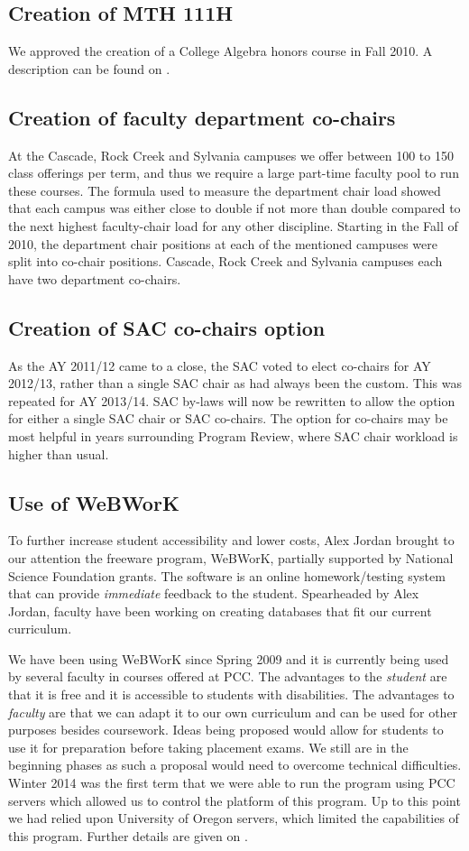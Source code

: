 \subsection{Creation of MTH 111H}
We approved the creation of a College Algebra honors course in Fall 2010.
A description can be found on .
\subsection{Creation of faculty department co-chairs}
At the Cascade, Rock Creek and Sylvania campuses we offer between 100 to 150 class offerings per term, and thus we require a large part-time faculty pool to run these courses.
The formula used to measure the department chair load showed that each campus was either close to double if not more than double compared to the next highest faculty-chair load for any other discipline.
Starting in the Fall of 2010, the department chair positions at each of the mentioned campuses were split into co-chair positions.
Cascade, Rock Creek and Sylvania campuses each have two department co-chairs.
\subsection{Creation of SAC co-chairs option}
As the AY 2011/12 came to a close, the SAC voted to elect co-chairs for AY 2012/13, rather than a single SAC chair as had always been the custom.
This was repeated for AY 2013/14.
SAC by-laws will now be rewritten to allow the option for either a single SAC chair or SAC co-chairs.
The option for co-chairs may be most helpful in years surrounding Program Review, where SAC chair workload is higher than usual.
\subsection{Use of WeBWorK}
To further increase student accessibility and lower costs, Alex Jordan brought to our attention the freeware program, WeBWorK,  partially supported by  National Science Foundation grants.
The software is an online homework/testing system that can provide \emph{immediate} feedback to the student.
Spearheaded by Alex Jordan, faculty have been working on creating databases that fit our current curriculum.

We have been using WeBWorK since Spring 2009 and it is currently being used by several faculty in courses offered at PCC.
The advantages to the \emph{student} are that it is free and it is accessible to students with disabilities.
The advantages to \emph{faculty} are that we can adapt it to our own curriculum and can be used for other purposes besides coursework.
Ideas being proposed would allow for students to use it for preparation before taking placement exams.
We still are in the beginning phases as such a proposal would need to overcome technical difficulties.
Winter 2014 was the first term that we were able to run the program using PCC servers which allowed us to control the platform of this program.
Up to this point we had relied upon University of Oregon servers, which limited the capabilities of this program.
Further details are given on .
